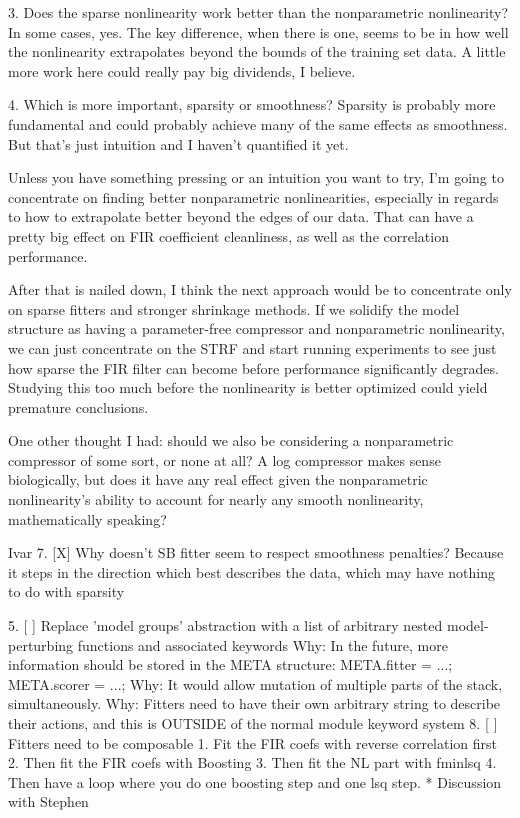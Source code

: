 3. Does the sparse nonlinearity work better than the nonparametric nonlinearity?
   In some cases, yes. The key difference, when there is one, seems to be in how well the nonlinearity extrapolates beyond the bounds of the training set data. 
   A little more work here could really pay big dividends, I believe. 

4. Which is more important, sparsity or smoothness?
   Sparsity is probably more fundamental and could probably achieve many of the same effects as smoothness. But that's just intuition and I haven't quantified it yet.   

Unless you have something pressing or an intuition you want to try, I'm going to concentrate on finding better nonparametric nonlinearities, especially in regards to how to extrapolate better beyond the edges of our data. That can have a pretty big effect on FIR coefficient cleanliness, as well as the correlation performance. 

After that is nailed down, I think the next approach would be to concentrate only on sparse fitters and stronger shrinkage methods. If we solidify the model structure as having a parameter-free compressor and nonparametric nonlinearity, we can just concentrate on the STRF and start running experiments to see just how sparse the FIR filter can become before performance significantly degrades. Studying this too much before the nonlinearity is better optimized could yield premature conclusions.

One other thought I had: should we also be considering a nonparametric compressor of some sort, or none at all? A log compressor makes sense biologically, but does it have any real effect given the nonparametric nonlinearity's ability to account for nearly any smooth nonlinearity, mathematically speaking?


Ivar
  7. [X] Why doesn't SB fitter seem to respect smoothness penalties?
	 Because it steps in the direction which best describes the data, which may have nothing to do with sparsity

  5. [ ] Replace 'model groups' abstraction with a list of arbitrary nested model-perturbing functions and associated keywords
	 Why: In the future, more information should be stored in the META structure:
         META.fitter = ...;  %
	 META.scorer = ...;  %
	 Why: It would allow mutation of multiple parts of the stack, simultaneously. 
	 Why: Fitters need to have their own arbitrary string to describe their actions, and this is OUTSIDE of the normal module keyword system
  8. [ ] Fitters need to be composable
	 1. Fit the FIR coefs with reverse correlation first
	 2. Then fit the FIR coefs with Boosting
	 3. Then fit the NL part with fminlsq
	 4. Then have a loop where you do one boosting step and one lsq step.
* Discussion with Stephen

